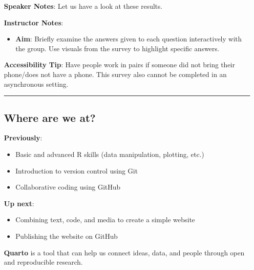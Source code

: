 \documentclass[
  letterpaper,
  DIV=11,
  numbers=noendperiod]{scrartcl}
\providecommand{\tightlist}{%
  \setlength{\itemsep}{0pt}\setlength{\parskip}{0pt}}
\begin{document}
\textbf{Speaker Notes}: Let us have a look at these results.

\textbf{Instructor Notes}:

\begin{itemize}
\tightlist
\item
  \textbf{Aim}: Briefly examine the answers given to each question
  interactively with the group. Use visuals from the survey to highlight
  specific answers.
\end{itemize}

\textbf{Accessibility Tip}: Have people work in pairs if someone did not
bring their phone/does not have a phone. This survey also cannot be
completed in an asynchronous setting.

\begin{center}\rule{0.5\linewidth}{0.5pt}\end{center}

\subsection{Where are we at?}\label{where-are-we-at}

\textbf{Previously}:

\begin{itemize}
\tightlist
\item
  Basic and advanced R skills (data manipulation, plotting, etc.)
\item
  Introduction to version control using Git
\item
  Collaborative coding using GitHub
\end{itemize}

\textbf{Up next}:

\begin{itemize}
\tightlist
\item
  Combining text, code, and media to create a simple website
\item
  Publishing the website on GitHub
\end{itemize}

\begin{tcolorbox}[enhanced jigsaw, opacitybacktitle=0.6, toptitle=1mm, colbacktitle=quarto-callout-note-color!10!white, toprule=.15mm, left=2mm, colback=white, colframe=quarto-callout-note-color-frame, opacityback=0, bottomtitle=1mm, breakable, titlerule=0mm, rightrule=.15mm, arc=.35mm, title=\textcolor{quarto-callout-note-color}{\faInfo}\hspace{0.5em}{Quarto and Open Science}, bottomrule=.15mm, coltitle=black, leftrule=.75mm]

\textbf{Quarto} is a tool that can help us connect ideas, data, and
people through open and reproducible research.

\end{tcolorbox}
\end{document}
